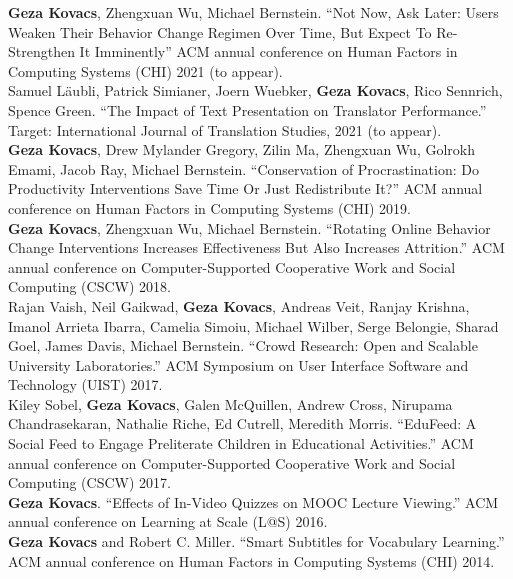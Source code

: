 \documentclass[10pt,A4]{article}
\begin{document}
\textbf{Geza Kovacs}, Zhengxuan Wu, Michael Bernstein. ``Not Now, Ask Later: Users Weaken Their Behavior Change Regimen Over Time, But Expect To Re-Strengthen It Imminently'' ACM annual conference on Human Factors in Computing Systems (CHI) 2021 (to appear).\\ %

Samuel Läubli, Patrick Simianer, Joern Wuebker, \textbf{Geza Kovacs}, Rico Sennrich, Spence Green. ``The Impact of Text Presentation on Translator Performance.'' Target: International Journal of Translation Studies, 2021 (to appear).\\

\textbf{Geza Kovacs}, Drew Mylander Gregory, Zilin Ma, Zhengxuan Wu, Golrokh Emami, Jacob Ray, Michael Bernstein. ``Conservation of Procrastination: Do Productivity Interventions Save Time Or Just Redistribute It?'' ACM annual conference on Human Factors in Computing Systems (CHI) 2019.\\ %

\textbf{Geza Kovacs}, Zhengxuan Wu, Michael Bernstein. ``Rotating Online Behavior Change Interventions Increases Effectiveness But Also Increases Attrition.'' ACM annual conference on Computer-Supported Cooperative Work and Social Computing (CSCW) 2018.\\ %

Rajan Vaish, Neil Gaikwad, \textbf{Geza Kovacs}, Andreas Veit, Ranjay Krishna, Imanol Arrieta Ibarra, Camelia Simoiu, Michael Wilber, Serge Belongie, Sharad Goel, James Davis, Michael Bernstein. ``Crowd Research: Open and Scalable University Laboratories.'' ACM Symposium on User Interface Software and Technology (UIST) 2017.\\ %

Kiley Sobel, \textbf{Geza Kovacs}, Galen McQuillen, Andrew Cross, Nirupama Chandrasekaran, Nathalie Riche, Ed Cutrell, Meredith Morris. ``EduFeed: A Social Feed to Engage Preliterate Children in Educational Activities.'' ACM annual conference on Computer-Supported Cooperative Work and Social Computing (CSCW) 2017.\\ %

\textbf{Geza Kovacs}. ``Effects of In-Video Quizzes on MOOC Lecture Viewing.'' ACM annual conference on Learning at Scale (L@S) 2016.\\ %

\textbf{Geza Kovacs} and Robert C. Miller. ``Smart Subtitles for Vocabulary Learning.'' ACM annual conference on Human Factors in Computing Systems (CHI) 2014.\\ %
\end{document}
